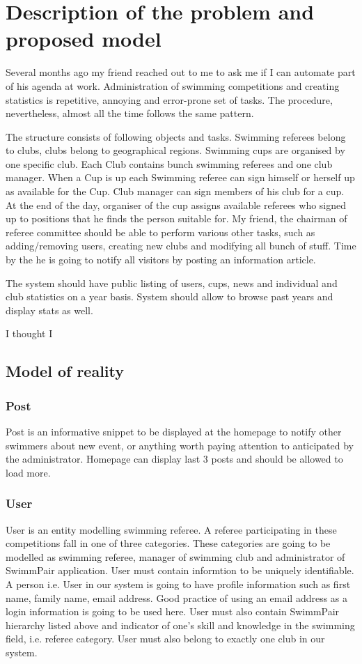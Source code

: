 \chapter{Description of the problem and proposed model}
\par
Several months ago my friend reached out to me to ask me if I can automate part of his agenda at work. Administration of swimming competitions and creating statistics is repetitive, annoying and error-prone set of tasks. The procedure, nevertheless, almost all the time follows the same pattern.
\par
The structure consists of following objects and tasks. Swimming referees belong to clubs, clubs belong to geographical regions. Swimming cups are organised by one specific club. Each Club contains bunch swimming referees and one club manager. When a Cup is up each Swimming referee can sign himself or herself up as available for the Cup. Club manager can sign members of his club for a cup. At the end of the day, organiser of the cup assigns available referees who signed up to positions that he finds the person suitable for. My friend, the chairman of referee committee should be able to perform various other tasks, such as adding/removing users, creating new clubs and modifying all bunch of stuff. Time by the he is going to notify all visitors by posting an information article.
\par
The system should have public listing of users, cups, news and individual and club statistics on a year basis. System should allow to browse past years and display stats as well. 

I thought I  

\section{Model of reality}

\subsection*{Post}
\par
Post is an informative snippet to be displayed at the homepage to notify other swimmers about new event, or anything worth paying attention to anticipated by the administrator. Homepage can display last 3 posts and should be allowed to load more.
\subsection*{User}
\par
User is an entity modelling swimming referee. A referee participating in these competitions fall in one of three categories. These categories are going to be modelled as swimming referee, manager of swimming club and administrator of SwimmPair application. User must contain informtion to be uniquely identifiable. A person i.e. User in our system is going to have profile information such as first name, family name, email address. Good practice of using an email address as a login information is going to be used here. User must also contain SwimmPair hierarchy listed above and indicator of one's skill and knowledge in the swimming field, i.e. referee category. User must also belong to exactly one club in our system.
